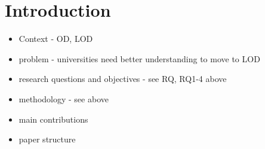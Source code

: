 \chapter{Introduction}
\begin{itemize}
	\item Context - OD, LOD 
	\item problem - universities need better understanding to move to LOD
	\item research questions and objectives - see RQ, RQ1-4 above
	\item methodology - see above
	\item main contributions
	\item paper structure
\end{itemize}